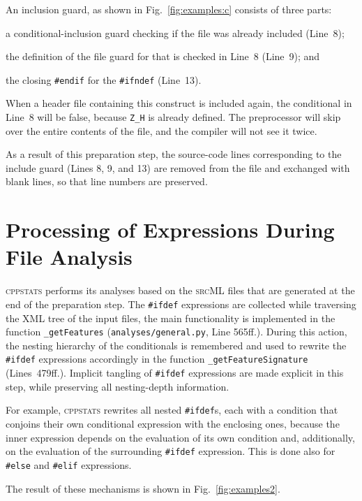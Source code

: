\documentclass[a4paper]{scrartcl}
\newcommand\code[1]{\texttt{#1}}
\newcommand\feature[1]{\texttt{#1}}
\newcommand\tool[1]{\textsc{#1}}
\newcommand\ifdeff[1]{\code{\##1}\xspace}
\newcommand\ifdef[0]{{\upshape\ifdeff{ifdef}}\xspace}
\newcommand\ifdefs[0]{\ifdef{}s\xspace}
\newcommand\cppstats[0]{\tool{cppstats}\xspace}
\begin{document}
An inclusion guard, as shown in Fig.\ \ref{fig:examples:c} consists of three parts:
\begin{inparaenum}[\itshape 1\upshape)]
\item a conditional-inclusion guard checking if the file was already included (Line~8);
\item the definition of the file guard for that is checked in Line~8 (Line~9); and
\item the closing \ifdeff{endif} for the \ifdeff{ifndef} (Line~13).
\end{inparaenum}

When a header file containing this construct is included again, the conditional in Line~8 will be false, because \feature{Z\_H} is already defined.
The preprocessor will skip over the entire contents of the file, and the compiler will not see it twice.

As a result of this preparation step, the source-code lines corresponding to the include guard (Lines 8, 9, and 13) are removed from the file and exchanged with blank lines, so that line numbers are preserved.



\section{Processing of Expressions During File Analysis}
\label{sec:processing}

\cppstats performs its analyses based on the \tool{srcML} files that are generated at the end of the preparation step.
The \ifdef expressions are collected while traversing the \tool{XML} tree of the input files, the main functionality is implemented in the function \code{\_getFeatures} (\code{analyses/general.py}, Line 565ff.).
During this action, the nesting hierarchy of the conditionals is remembered and used to rewrite the \ifdef expressions accordingly in the function \code{\_getFeatureSignature} (Lines~479ff.).
Implicit tangling of \ifdef expressions are made explicit in this step, while preserving all nesting-depth information.

For example, \cppstats rewrites all nested \ifdefs, each with a condition that conjoins their own conditional expression with the enclosing ones, because the inner expression depends on the evaluation of its own condition and, additionally, on the evaluation of the surrounding \ifdef expression.
This is done also for \ifdeff{else} and \ifdeff{elif} expressions.
 
The result of these mechanisms is shown in Fig.\ \ref{fig:examples2}.
\end{document}

